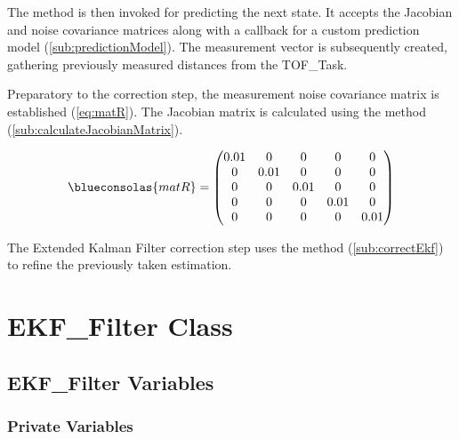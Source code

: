 The  method is then invoked for predicting the next state. It accepts the Jacobian and noise covariance matrices along with a callback for a custom prediction model (\ref{sub:predictionModel}). The measurement vector  is subsequently created, gathering previously measured distances from the TOF\_Task.

Preparatory to the correction step, the measurement noise covariance matrix  is established (\ref{eq:matR}). The Jacobian matrix  is calculated using the  method (\ref{sub:calculateJacobianMatrix}).

\begin{equation}
	\begin{centering}
		\blueconsolas{matR} =
		\begin{pmatrix}
			0.01 & 0 & 0 & 0 & 0 \\
			0 & 0.01 & 0 & 0 & 0 \\
			0 & 0 & 0.01 & 0 & 0 \\
			0 & 0 & 0 & 0.01 & 0 \\
			0 & 0 & 0 & 0 & 0.01 \\
		\end{pmatrix}
	\end{centering}
	\label{eq:matR}
\end{equation}

The Extended Kalman Filter correction step uses the  method (\ref{sub:correctEkf}) to refine the previously taken estimation. 

\section{EKF\_Filter Class}
\label{sec:EKF_Filter Class}

\subsection{EKF\_Filter Variables}
\label{sub:EKF_Filter_Variables}

\subsubsection{Private Variables}

